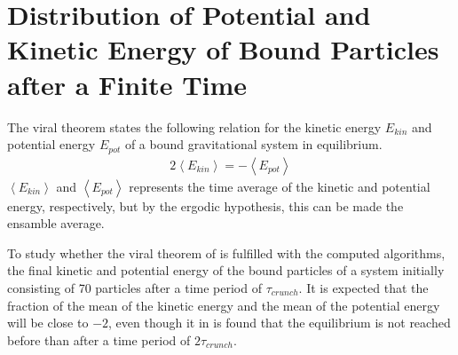 \section{Distribution of Potential and Kinetic Energy of Bound Particles after a Finite Time}
\label{sec:DistributionPotKinEnBound}
The viral theorem states the following relation for the kinetic energy $E_{kin}$ and potential energy $E_{pot}$ of a bound gravitational system in equilibrium. 
\begin{align}
	2\left< E_{kin} \right> = - \left< E_{pot} \right>
	\label{eq:ViralTheorem}
\end{align}
$\left< E_{kin} \right>$ and $\left< E_{pot} \right>$ represents the time average of the kinetic and potential energy, respectively, but by the ergodic hypothesis, this can be made the ensamble average. 

To study whether the viral theorem of  is fulfilled with the computed algorithms, the final kinetic and potential energy of the bound particles of a system initially consisting of 70 particles after a time period of $\tau_{crunch}$.
It is expected that the fraction of the mean of the kinetic energy and the mean of the potential energy will be close to $-2$, even though it in  is found that the equilibrium is not reached before than after a time period of $2\tau_{crunch}$. 

